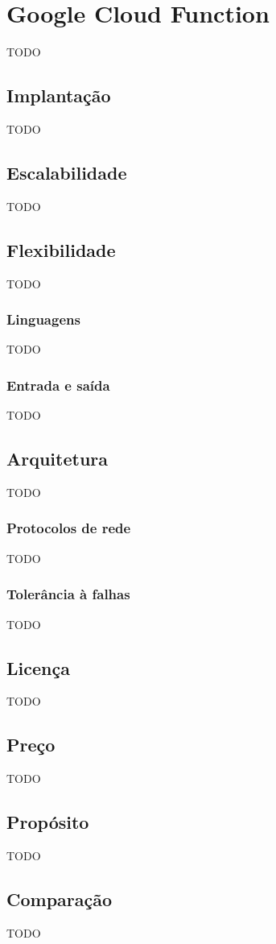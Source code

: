 \section{Google Cloud Function}

TODO

\subsection{Implantação}

TODO

\subsection{Escalabilidade}

TODO

\subsection{Flexibilidade}

TODO

\subsubsection{Linguagens}

TODO

\subsubsection{Entrada e saída}

TODO

\subsection{Arquitetura}

TODO

\subsubsection{Protocolos de rede}

TODO

\subsubsection{Tolerância à falhas}

TODO

\subsection{Licença}

TODO

\subsection{Preço}

TODO

\subsection{Propósito}

TODO

\subsection{Comparação}

TODO
